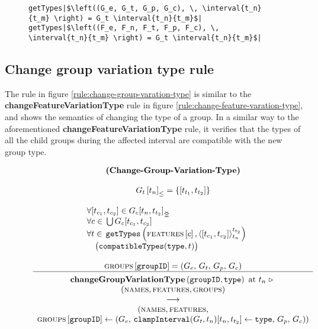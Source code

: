 \begin{figure}
  \begin{verbatim}
getTypes|$\left((G_e, G_t, G_p, G_c), \, \interval{t_n}{t_m} \right) = G_t \interval{t_n}{t_m}$|
getTypes|$\left((F_e, F_n, F_t, F_p, F_c), \, \interval{t_n}{t_m} \right) = G_t \interval{t_n}{t_m}$|
  \end{verbatim}
  \caption{\label{get-types}}
\end{figure}

\subsection{Change group variation type rule}
\label{sub:change-group-variation-type-rule}
The rule in figure \vref{rule:change-group-varation-type} is similar to the \textbf{changeFeatureVariationType} rule in figure \vref{rule:change-feature-varation-type}, and shows the semantics of changing the type of a group. In a similar way to the aforementioned \textbf{changeFeatureVariationType} rule, it verifies that the types of all the child groups during the affected interval are compatible with the new group type.

\begin{figure}
    \renewcommand{\arraystretch}{1.1}
    \sossize$$\begin{array}{c}
      \ntyperule{Change-Group-Variation-Type}
      {\\
        \containing{G_t}{t_n} = \set{\interval{t_{t_1}}{t_{t_2}}} %
        \\
        \\
        \qqquad \qqquad \forall \interval{t_{c_1}}{t_{c_2}} \in \overlapping{G_c}{t_n}{t_{t_2}}\hfill\\ %
        \qqquad \qqquad\forall c \in \, \bigcup G_c \interval{t_{c_1}}{t_{c_2}}\hfill\\ %
        \qqquad \qqquad\forall t \in \, \var{getTypes}\left(\lookup{\features}{c}, \clamp{\interval{t_{c_1}}{t_{c_2}}}{t_n}{t_{t_2}}\right)\hfill \\ %
         \qqquad \qqquad \quad \big(\var{compatibleTypes}(\var{type}, t)\big)\hfill\\
         \\

        \lookup{\groups{}}{\var{groupID}} = \left( G_e,\, G_t,\, G_p,\, G_c \right)
      }
      {
        \textbf{changeGroupVariationType}\left( \var{groupID}, \var{type}\right) \text{ at } t_n \shove \\
        (\names{}, \features{}, \groups{}) \\
        \transition \\
        (\names{}, \features{}, \\
        \lookup{\groups{}}{\var{groupID}} \assign \left( G_e,\, \var{clampInterval}(G_t, t_n) \interval{t_n}{t_{t_2}} \assign \var{type},\, G_p,\, G_c \right))
      }
    \end{array}$$
  \caption{\label{rule:change-group-varation-type}}
\end{figure}

